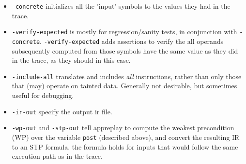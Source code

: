 \begin{itemize}
\item \texttt {-concrete} initializes all the 'input' symbols to
the values they had in the trace.

\item \texttt{-verify-expected}  is  mostly  for regression/sanity  tests,  in
conjunction with \verb'-concrete'. \texttt{-verify-expected} adds
assertions to verify the all operands subsequently computed from those
symbols have the same value as they did in the trace, as they should
in this case.

\item \texttt{-include-all} translates and includes \emph{all} instructions,
rather than only those that (may) operate on tainted data. Generally
not desirable, but sometimes useful for debugging.

\item \texttt{-ir-out} specify the output ir file.

\item \texttt{-wp-out} and  \texttt{-stp-out} tell  appreplay to
compute the weakest precondition (WP) over the variable \verb'post'
(described above), and convert the resulting IR to an STP formula. the
formula holds for inputs that would follow the same execution path as
in the trace.

\end{itemize}
